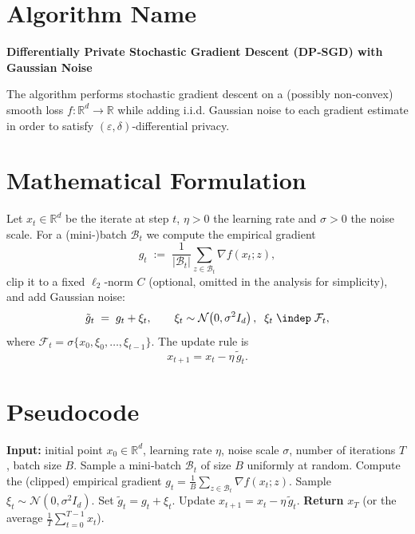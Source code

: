 \documentclass{article}
\newcommand{\RR}{\mathbb{R}}
\begin{document}
\section*{Algorithm Name}
\textbf{Differentially Private Stochastic Gradient Descent (DP‑SGD) with Gaussian Noise}  

The algorithm performs stochastic gradient descent on a (possibly non‑convex) smooth loss
$f:\RR^{d}\rightarrow\RR$ while adding i.i.d. Gaussian noise to each gradient estimate in order
to satisfy $(\varepsilon,\delta)$‑differential privacy.

\section*{Mathematical Formulation}
Let $x_{t}\in\RR^{d}$ be the iterate at step $t$, $\eta>0$ the learning rate and
$\sigma>0$ the noise scale.  For a (mini‑)batch $\mathcal{B}_{t}$ we compute the
empirical gradient
\[
g_{t}\;:=\;\frac{1}{|\mathcal{B}_{t}|}\sum_{z\in\mathcal{B}_{t}}\nabla f(x_{t};z),
\]
clip it to a fixed $\ell_{2}$‑norm $C$ (optional, omitted in the analysis for simplicity),
and add Gaussian noise:
\[
\tilde{g}_{t}\;=\;g_{t}+ \xi_{t},\qquad 
\xi_{t}\sim\mathcal{N}\!\left(0,\sigma^{2}I_{d}\right),\;\;\xi_{t}\;\indep\;\mathcal{F}_{t},
\]
where $\mathcal{F}_{t}=\sigma\{x_{0},\xi_{0},\dots,\xi_{t-1}\}$.
The update rule is
\[
\boxed{x_{t+1}=x_{t}-\eta\,\tilde{g}_{t}}.
\]

\section*{Pseudocode}
\begin{algorithm}[H]
\caption{DP‑SGD with Gaussian Noise}
\begin{algorithmic}[1]
\State \textbf{Input:} initial point $x_{0}\in\RR^{d}$, learning rate $\eta$, noise scale $\sigma$, 
number of iterations $T$, batch size $B$.
    \State Sample a mini‑batch $\mathcal{B}_{t}$ of size $B$ uniformly at random.
    \State Compute the (clipped) empirical gradient 
          $g_{t}= \frac{1}{B}\sum_{z\in\mathcal{B}_{t}}\nabla f(x_{t};z)$.
    \State Sample $\xi_{t}\sim\mathcal{N}(0,\sigma^{2}I_{d})$.
    \State Set $\tilde{g}_{t}=g_{t}+\xi_{t}$.
    \State Update $x_{t+1}=x_{t}-\eta\,\tilde{g}_{t}$.
\EndFor
\State \textbf{Return} $x_{T}$ (or the average $\frac{1}{T}\sum_{t=0}^{T-1}x_{t}$).
\end{algorithmic}
\end{algorithm}
\end{document}
